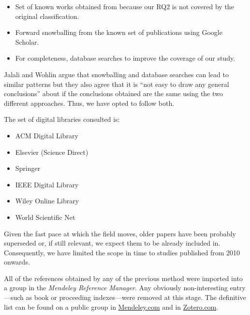 \begin{itemize}
  \item Set of known works obtained from \cite{Idreos2015} because our RQ2 is
    not covered by the original classification.
  \item Forward snowballing\cite{Webster2002} from the known set of publications using Google Scholar.
  \item For completeness, database searches to improve the coverage of our study.
\end{itemize}

Jalali and Wohlin\cite{Jalali2012} argue that snowballing and database searches
can lead to similar patterns but they also agree that it is
``not easy to draw any general conclusions'' about if the conclusions obtained are the same
using the two different approaches. Thus, we have opted to follow both.

The set of digital libraries consulted is:

\begin{itemize}
  \item ACM Digital Library
  \item Elsevier (Science Direct)
  \item Springer
  \item IEEE Digital Library
  \item Wiley Online Library
  \item World Scientific Net
\end{itemize}

Given the fast pace at which the field moves, older papers have been probably
superseded or, if still relevant, we expect them to be already included in\cite{Idreos2015}.
Consequently, we have limited the scope in time to studies published from 2010 onwards.

All of the references obtained by any of the previous method were imported into
a group in the \emph{Mendeley Reference Manager}. Any obviously non-interesting entry
---such as book or proceeding indexes---were removed at this stage.
The definitive list can be found on a public group in
\href{https://www.mendeley.com/community/interactive-data-exploration-in-science-systematic-mapping/}{Mendeley.com} and in
\href{https://www.zotero.org/groups/4517638/interactive-data-exploration-in-science-systematic-mapping/library}{Zotero.com}\footnotemark.


